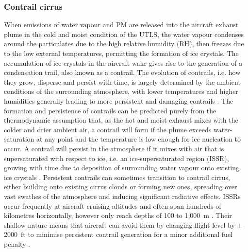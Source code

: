 \subsubsection{Contrail cirrus}
When emissions of water vapour and PM are released into the aircraft exhaust plume in the cold and moist condition of the UTLS, the water vapour condenses around the particulates due to the high relative humidity (RH), then freezes due to the low external temperatures, permitting the formation of ice crystals. The accumulation of ice crystals in the aircraft wake gives rise to the generation of a condensation trail, also known as a contrail. The evolution of contrails, i.e. how they grow, disperse and persist with time, is largely determined by the ambient conditions of the surrounding atmosphere, with lower temperatures and higher humidities generally leading to more persistent and damaging contrails \cite{Schumann2005}. The formation and persistence of contrails can be predicted purely from the thermodynamic assumption that, as the hot and moist exhaust mixes with the colder and drier ambient air, a contrail will form if the plume exceeds water-saturation at any point and the temperature is low enough for ice nucleation to occur. A contrail will persist in the atmosphere if it mixes with air that is supersaturated with respect to ice, i.e. an ice-supersaturated region (ISSR), growing with time due to deposition of surrounding water vapour onto existing ice crystals \cite{Karcher2018, Schumann2005}. Persistent contrails can sometimes transition to contrail cirrus, either building onto existing cirrus clouds or forming new ones, spreading over vast swathes of the atmosphere \cite{Minnis1998} and inducing significant radiative effects. ISSRs occur frequently at aircraft cruising altitudes and often span hundreds of kilometres horizontally, however only reach depths of 100 to 1,000~m \cite{Spichtinger2016, Dickson2010}. Their shallow nature means that aircraft can avoid them by changing flight level by $\pm$2000~ft to minimise persistent contrail generation for a minor additional fuel penalty \cite{Schumann2011}.

